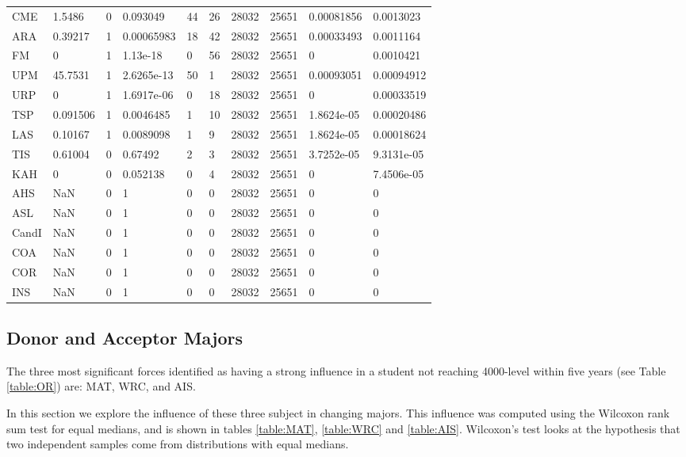 {\begin{longtable}{llllllllll}
CME & 1.5486 & 0 & 0.093049 & 44 & 26 & 28032 & 25651 & 0.00081856 & 0.0013023 \\ 
ARA & 0.39217 & 1 & 0.00065983 & 18 & 42 & 28032 & 25651 & 0.00033493 & 0.0011164 \\ 
FM & 0 & 1 & 1.13e-18 & 0 & 56 & 28032 & 25651 & 0 & 0.0010421 \\ 
UPM & 45.7531 & 1 & 2.6265e-13 & 50 & 1 & 28032 & 25651 & 0.00093051 & 0.00094912 \\ 
URP & 0 & 1 & 1.6917e-06 & 0 & 18 & 28032 & 25651 & 0 & 0.00033519 \\ 
TSP & 0.091506 & 1 & 0.0046485 & 1 & 10 & 28032 & 25651 & 1.8624e-05 & 0.00020486 \\ 
LAS & 0.10167 & 1 & 0.0089098 & 1 & 9 & 28032 & 25651 & 1.8624e-05 & 0.00018624 \\ 
TIS & 0.61004 & 0 & 0.67492 & 2 & 3 & 28032 & 25651 & 3.7252e-05 & 9.3131e-05 \\ 
KAH & 0 & 0 & 0.052138 & 0 & 4 & 28032 & 25651 & 0 & 7.4506e-05 \\ 
AHS & NaN & 0 & 1 & 0 & 0 & 28032 & 25651 & 0 & 0 \\ 
ASL & NaN & 0 & 1 & 0 & 0 & 28032 & 25651 & 0 & 0 \\ 
CandI & NaN & 0 & 1 & 0 & 0 & 28032 & 25651 & 0 & 0 \\ 
COA & NaN & 0 & 1 & 0 & 0 & 28032 & 25651 & 0 & 0 \\ 
COR & NaN & 0 & 1 & 0 & 0 & 28032 & 25651 & 0 & 0 \\ 
INS & NaN & 0 & 1 & 0 & 0 & 28032 & 25651 & 0 & 0 \\ 
\hline 
\end{longtable}} 


\newpage
\subsection{Donor and Acceptor Majors}

The three most significant forces identified as having a strong influence in a student not reaching 4000-level within five years (see Table \ref{table:OR}) are: MAT, WRC, and AIS. 

In this section we explore the influence of these three subject in changing majors. This influence was computed using the Wilcoxon rank sum test for equal medians, and is shown in tables \ref{table:MAT}, \ref {table:WRC} and \ref{table:AIS}. Wilcoxon's test looks at the hypothesis that two independent samples come from distributions with equal medians. 

